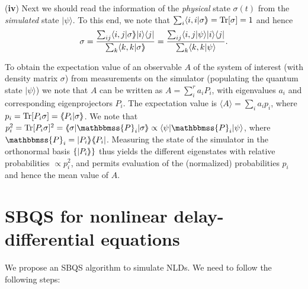 \documentclass[aps,pra,twocolumn,floatfix,groupedaddress,superscriptaddress,nofootinbib,notitlepage]{revtex4-2}
\def \llangle{{\langle\hskip-1mm\langle}}
\def \rrangle{{\rangle\hskip-1mm\rangle}}
\begin{document}
(\textbf{iv}) Next we should read the information of the \textit{physical} state $\sigma(t)$ from the \textit{simulated} state $|\psi\rangle$. To this end, we note that $\sum_{i}\langle i,i|\sigma\rrangle=\mathrm{Tr}[\sigma]=1$ and hence
\begin{align}
\sigma=\frac{\sum_{ij} \langle i, j|\sigma\rrangle |i\rangle\langle j|}{\sum_{k} \langle k, k|\sigma\rrangle}=\frac{\sum_{ij} \langle i,j|\psi\rangle |i\rangle\langle j|}{\sum_{k} \langle k, k |\psi\rangle}.
\end{align} 

To obtain the expectation value of an observable $A$ of the system of interest (with density matrix $\sigma$) from measurements on the simulator (populating the quantum state $|\psi \rangle$) we note that $A$ can be written as $A=\sum_{i}^{r} a_{i} P_{i}$, with eigenvalues $a_{i}$ and corresponding eigenprojectors $P_{i}$. The expectation value is $\langle A\rangle = \sum_i a_i p_i$, where $p_{i}=\mathrm{Tr}[P_{i} \sigma]=\llangle P_i| \sigma \rrangle$. We note that $p_{i} 
^2 =\mathrm{Tr}[P_i \sigma]^2=\llangle \sigma| \mathbbmss{P}_i| \sigma \rrangle \propto \langle \psi |\mathbbmss{P}_i|\psi \rangle$, where $\mathbbmss{P}_i=|P_i\rrangle \llangle P_i|$. Measuring the state of the simulator in the orthonormal basis $\{|P_i\rrangle\}$ thus  yields the different eigenstates with relative probabilities $\propto p_i^2$, and permits evaluation of the (normalized) probabilities $p_i$ and hence the mean value of $A$.    
\section{SBQS for nonlinear delay-differential equations}

We propose an SBQS algorithm to simulate NLDs. We need to follow the following steps:\\
\end{document}
